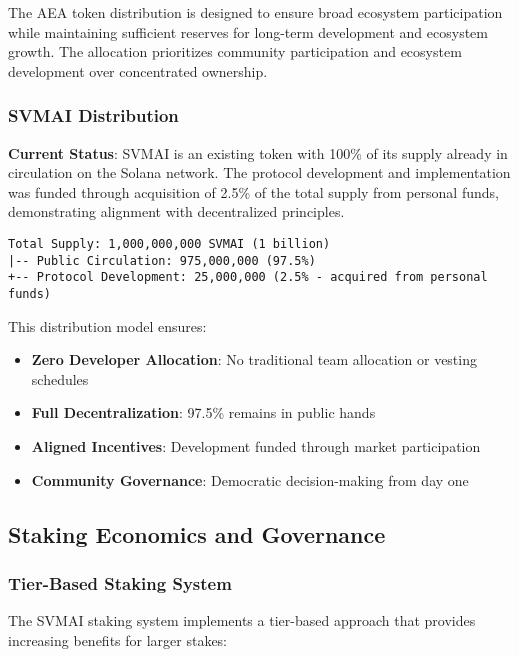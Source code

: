 \documentclass[12pt,a4paper]{article}
\begin{document}
The AEA token distribution is designed to ensure broad ecosystem participation while maintaining sufficient reserves for long-term development and ecosystem growth. The allocation prioritizes community participation and ecosystem development over concentrated ownership.

\subsubsection{SVMAI Distribution}

\textbf{Current Status}: SVMAI is an existing token with 100\% of its supply already in circulation on the Solana network. The protocol development and implementation was funded through acquisition of 2.5\% of the total supply from personal funds, demonstrating alignment with decentralized principles.

\begin{verbatim}
Total Supply: 1,000,000,000 SVMAI (1 billion)
|-- Public Circulation: 975,000,000 (97.5%)
+-- Protocol Development: 25,000,000 (2.5% - acquired from personal funds)
\end{verbatim}

This distribution model ensures:
\begin{itemize}
\item \textbf{Zero Developer Allocation}: No traditional team allocation or vesting schedules
\item \textbf{Full Decentralization}: 97.5\% remains in public hands
\item \textbf{Aligned Incentives}: Development funded through market participation
\item \textbf{Community Governance}: Democratic decision-making from day one
\end{itemize}

\subsection{Staking Economics and Governance}

\subsubsection{Tier-Based Staking System}

The SVMAI staking system implements a tier-based approach that provides increasing benefits for larger stakes:
\end{document}
